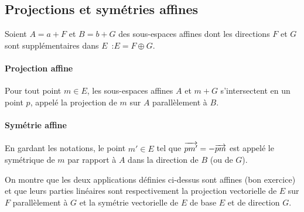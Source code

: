 \subsection{Projections et symétries affines}
\label{chap0-subsec:projsymaff}
Soient $A=a+F$ et $B=b+G$ des sous-espaces affines dont les directions $F$ et $G$ sont supplémentaires dans $E$~:$E=F\oplus G$.
\paragraph{Projection affine} Pour tout point $m \in E$, les sous-espaces affines $A$ et $m+G$ s'intersectent en un point $p$, appelé la projection de $m$ sur $A$ parallèlement à $B$.
\paragraph{Symétrie affine} En gardant les notations, le point $m' \in E$ tel que $\overrightarrow{pm'} = -\overrightarrow{pm}$ est appelé le symétrique de $m$ par rapport à $A$ dans la direction de $B$ (ou de $G$).

On montre que les deux applications définies ci-dessus sont affines (bon exercice) et que leurs parties linéaires sont respectivement la projection vectorielle de $E$ sur $F$ parallèlement à $G$ et la symétrie vectorielle de $E$ de base $E$ et de direction $G$.